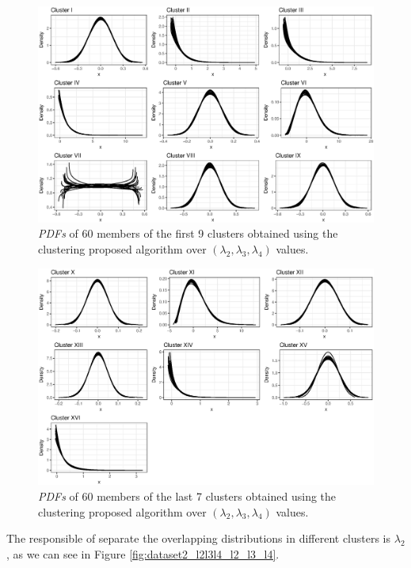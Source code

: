 \begin{figure}[ht]
    \centering
    \includegraphics[width=\textwidth]{img/gld_clustering/datasetII/l2l3l4/clusters_part_I_scale_2.eps}
    \caption{\textit{PDFs} of 60 members of the first 9 clusters obtained using the clustering  proposed algorithm over $(\lambda_{2}, \lambda_{3}, \lambda_{4})$ values.}
    \label{fig:dataset2_l2l3l4_cl1}
\end{figure}

\begin{figure}[ht]
    \centering
    \includegraphics[width=\textwidth]{img/gld_clustering/datasetII/l2l3l4/clusters_part_II_scale_2.eps}
    \caption{\textit{PDFs} of 60 members of the last 7 clusters obtained using the clustering  proposed algorithm over $(\lambda_{2}, \lambda_{3}, \lambda_{4})$ values.}
    \label{fig:dataset2_l2l3l4_cl12}
\end{figure}

The responsible of separate the overlapping distributions in different clusters is $\lambda_{2}$, as we can see in Figure \ref{fig:dataset2_l2l3l4_l2_l3_l4}.

